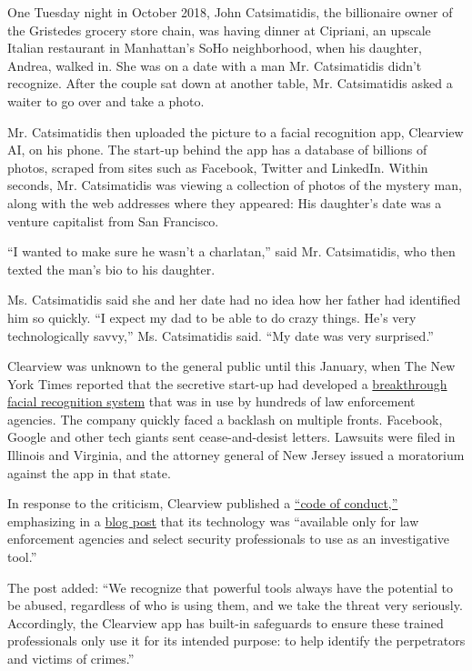 One Tuesday night in October 2018, John Catsimatidis, the billionaire
owner of the Gristedes grocery store chain, was having dinner at
Cipriani, an upscale Italian restaurant in Manhattan's SoHo
neighborhood, when his daughter, Andrea, walked in. She was on a date
with a man Mr. Catsimatidis didn't recognize. After the couple sat down
at another table, Mr. Catsimatidis asked a waiter to go over and take a
photo.

Mr. Catsimatidis then uploaded the picture to a facial recognition app,
Clearview AI, on his phone. The start-up behind the app has a database
of billions of photos, scraped from sites such as Facebook, Twitter and
LinkedIn. Within seconds, Mr. Catsimatidis was viewing a collection of
photos of the mystery man, along with the web addresses where they
appeared: His daughter's date was a venture capitalist from San
Francisco.

``I wanted to make sure he wasn't a charlatan,'' said Mr. Catsimatidis,
who then texted the man's bio to his daughter.

Ms. Catsimatidis said she and her date had no idea how her father had
identified him so quickly. ``I expect my dad to be able to do crazy
things. He's very technologically savvy,'' Ms. Catsimatidis said. ``My
date was very surprised.''

Clearview was unknown to the general public until this January, when The
New York Times reported that the secretive start-up had developed a
\href{https://www.nytimes.com/2020/01/18/technology/clearview-privacy-facial-recognition.html}{breakthrough
facial recognition system} that was in use by hundreds of law
enforcement agencies. The company quickly faced a backlash on multiple
fronts. Facebook, Google and other tech giants sent cease-and-desist
letters. Lawsuits were filed in Illinois and Virginia, and the attorney
general of New Jersey issued a moratorium against the app in that state.

In response to the criticism, Clearview published a
\href{https://blog.clearview.ai/code_of_conduct.pdf}{``code of
conduct,''} emphasizing in a
\href{https://blog.clearview.ai/post/2020-01-27-code-of-conduct/}{blog
post} that its technology was ``available only for law enforcement
agencies and select security professionals to use as an investigative
tool.''

The post added: ``We recognize that powerful tools always have the
potential to be abused, regardless of who is using them, and we take the
threat very seriously. Accordingly, the Clearview app has built-in
safeguards to ensure these trained professionals only use it for its
intended purpose: to help identify the perpetrators and victims of
crimes.''

